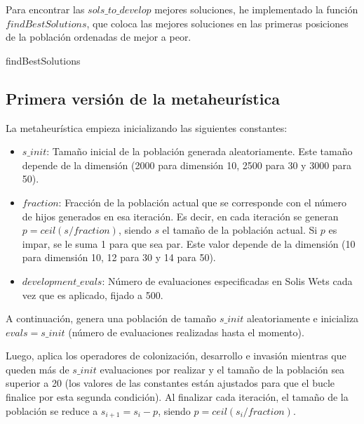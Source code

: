 \documentclass[10pt,a4paper]{article}
\begin{document}
Para encontrar las $sols\_to\_develop$ mejores soluciones, he implementado la función $findBestSolutions$, que coloca las mejores soluciones en las primeras posiciones de la población ordenadas de mejor a peor.\\

\begin{algorithm}[H]
	\caption{findBestSolutions}
\end{algorithm}





\subsection{Primera versión de la metaheurística}

La metaheurística empieza inicializando las siguientes constantes:

\begin{itemize}
	\item $s\_init$: Tamaño inicial de la población generada aleatoriamente. Este tamaño depende de la dimensión (2000 para dimensión 10, 2500 para 30 y 3000 para 50).
	\item $fraction$: Fracción de la población actual que se corresponde con el número de hijos generados en esa iteración. Es decir, en cada iteración se generan $p = ceil(s/fraction)$, siendo $s$ el tamaño de la población actual. Si $p$ es impar, se le suma 1 para que sea par. Este valor depende de la dimensión (10 para dimensión 10, 12 para 30 y 14 para 50).
	\item $development\_evals$: Número de evaluaciones especificadas en Solis Wets cada vez que es aplicado, fijado a 500.
\end{itemize}

A continuación, genera una población de tamaño $s\_init$ aleatoriamente e inicializa $evals = s\_init$ (número de evaluaciones realizadas hasta el momento).

Luego, aplica los operadores de colonización, desarrollo e invasión mientras que queden más de $s\_init$ evaluaciones por realizar y el tamaño de la población sea superior a 20 (los valores de las constantes están ajustados para que el bucle finalice por esta segunda condición). Al finalizar cada iteración, el tamaño de la población se reduce a $s_{i+1} = s_i - p$, siendo $p = ceil(s_i/fraction)$.
\end{document}
